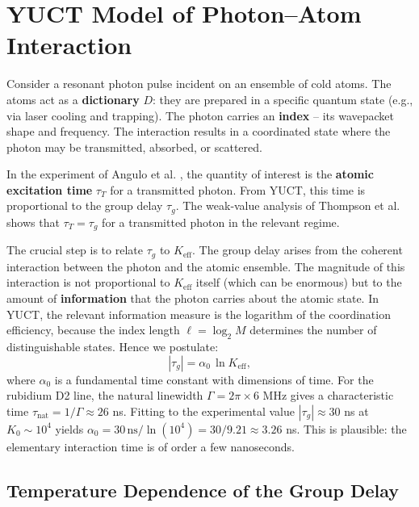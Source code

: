 \documentclass[12pt,a4paper]{article}
\newcommand{\Keff}{K_{\mathrm{eff}}}
\begin{document}
	\section{YUCT Model of Photon–Atom Interaction}
	
	Consider a resonant photon pulse incident on an ensemble of cold atoms. The atoms act as a \textbf{dictionary} \(D\): they are prepared in a specific quantum state (e.g., via laser cooling and trapping). The photon carries an \textbf{index} – its wavepacket shape and frequency. The interaction results in a coordinated state where the photon may be transmitted, absorbed, or scattered.
	
	In the experiment of Angulo et al. \cite{Angulo2024}, the quantity of interest is the \textbf{atomic excitation time} \(\tau_T\) for a transmitted photon. From YUCT, this time is proportional to the group delay \(\tau_g\). The weak‑value analysis of Thompson et al. \cite{Thompson2023} shows that \(\tau_T = \tau_g\) for a transmitted photon in the relevant regime.
	
	The crucial step is to relate \(\tau_g\) to \(\Keff\). The group delay arises from the coherent interaction between the photon and the atomic ensemble. The magnitude of this interaction is not proportional to \(\Keff\) itself (which can be enormous) but to the amount of \textbf{information} that the photon carries about the atomic state. In YUCT, the relevant information measure is the logarithm of the coordination efficiency, because the index length \(\ell = \log_2 M\) determines the number of distinguishable states. Hence we postulate:
	\begin{equation}
		|\tau_g| = \alpha_0 \, \ln\Keff,
		\label{eq:tau_log}
	\end{equation}
	where \(\alpha_0\) is a fundamental time constant with dimensions of time. For the rubidium D2 line, the natural linewidth \(\Gamma = 2\pi \times 6\) MHz gives a characteristic time \(\tau_{\text{nat}} = 1/\Gamma \approx 26\) ns. Fitting to the experimental value \(|\tau_g| \approx 30\) ns at \(K_0 \sim 10^4\) yields \(\alpha_0 = 30\,\text{ns} / \ln(10^4) = 30 / 9.21 \approx 3.26\) ns. This is plausible: the elementary interaction time is of order a few nanoseconds.
	
	\subsection{Temperature Dependence of the Group Delay}
	
\end{document}
